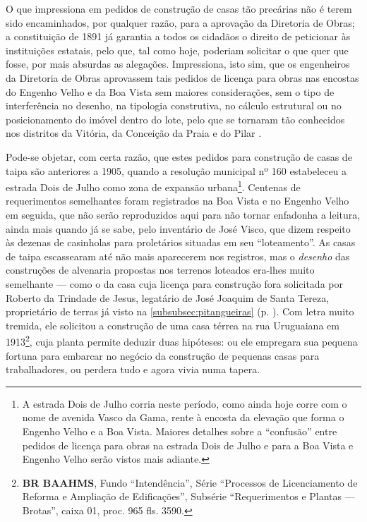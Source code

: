 O que impressiona em pedidos de construção de casas tão precárias não é terem sido encaminhados, por qualquer razão, para a aprovação da Diretoria de Obras; a constituição de 1891 já garantia a todos os cidadãos o direito de peticionar às instituições estatais, pelo que, tal como hoje, poderiam solicitar o que quer que fosse, por mais absurdas as alegações. Impressiona, isto sim, que os engenheiros da Diretoria de Obras aprovassem tais pedidos de licença para obras nas encostas do Engenho Velho e da Boa Vista sem maiores considerações, sem o tipo de interferência no desenho, na tipologia construtiva, no cálculo estrutural ou no posicionamento do imóvel dentro do lote, pelo que se tornaram tão conhecidos nos distritos da Vitória, da Conceição da Praia e do Pilar \cite{almeida_victoria_1997,almeida_vitrinescomercio_2014}. 

Pode-se objetar, com certa razão, que estes pedidos para construção de casas de taipa são anteriores a 1905, quando a resolução municipal nº 160 estabeleceu a estrada Dois de Julho como zona de expansão urbana\footnote{A estrada Dois de Julho corria neste período, como ainda hoje corre com o nome de avenida Vasco da Gama, rente à encosta da elevação que forma o Engenho Velho e a Boa Vista. Maiores detalhes sobre a ``confusão'' entre pedidos de licença para obras na estrada Dois de Julho e para a Boa Vista e Engenho Velho serão vistos mais adiante.}. Centenas de requerimentos semelhantes foram registrados na Boa Vista e no Engenho Velho em seguida, que não serão reproduzidos aqui para não tornar enfadonha a leitura, ainda mais quando já se sabe, pelo inventário de José Visco, que dizem respeito às dezenas de casinholas para proletários situadas em seu ``loteamento''. As casas de taipa escassearam até não mais aparecerem nos registros, mas o \textit{desenho} das construções de alvenaria propostas nos terrenos loteados era-lhes muito semelhante --- como o da casa cuja licença para construção fora solicitada por Roberto da Trindade de Jesus, legatário de José Joaquim de Santa Tereza, proprietário de terras já visto na \autoref{subsubsec:pitangueiras} (p. \pageref{subsubsec:pitangueiras}). Com letra muito tremida, ele solicitou a construção de uma casa térrea na rua Uruguaiana em 1913\footnote{\textbf{BR BAAHMS}, Fundo ``Intendência'', Série ``Processos de Licenciamento de Reforma e Ampliação de Edificações'', Subsérie ``Requerimentos e Plantas --- Brotas'', caixa 01, proc. 965 fls. 3590.}, cuja planta permite deduzir duas hipóteses: ou ele empregara sua pequena fortuna para embarcar no negócio da construção de pequenas casas para trabalhadores, ou perdera tudo e agora vivia numa tapera.

